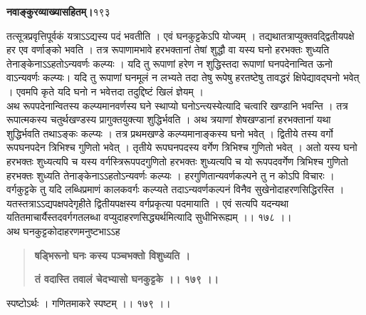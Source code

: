 \documentclass[11pt, openany]{book}
\begin{document}
\onehalfspacing
\hspace{2in}\textbf{नवाङ्कुरव्याख्यासहितम्।}\hspace{2in}१९३ 

\vspace{5mm}

\begin{sloppypar}
\hangindent=0.2in तत्सूत्रप्रवृत्तिपूर्वकं यत्राऽऽद्यस्य पदं भवतीति । एवं घनकुट्टकेऽपि योज्यम् । तद्यथा\textendash तत्राप्युक्तवद्द्वितीयपक्षे हर एव वर्णाङ्को भवति । तत्र रूपाणामभावे हरभक्तानां तेषां शुद्धौ वा यस्य घनो हरभक्तः शुध्यति तेनाङ्केनाऽऽहतोऽन्यवर्णः कल्प्यः । यदि तु रूपाणां हरेण न शुद्धिस्तदा रूपाणां घनपदेनान्वित ऊनो वाऽन्यवर्णः कल्प्यः। यदि तु रूपाणां घनमूलं न लभ्यते तदा तेषु रूपेषु हरतष्टेषु तावद्धरं क्षिपेद्यावद्घनो भवेत् । एवमपि कृते यदि घनो न भवेत्तदा तदुद्दिष्टं खिलं ज्ञेयम् ।\\ 

\hangindent=0.2in \hspace{0.2in}अथ रूपपदेनान्वितस्य कल्प्यमानवर्णस्य घने स्थाप्यो घनोऽन्त्यस्येत्यादि चत्वारि खण्डानि भवन्ति । तत्र रूपात्मकस्य चतुर्थखण्डस्य प्रागुक्तयुक्त्या शुद्धिर्भवति । अथ त्रयाणां शेषखण्डानां हरभक्तानां यथा शुद्धिर्भवति तथाऽङ्कः कल्प्यः । तत्र प्रथमखण्डे कल्प्यमानाङ्कस्य घनो भवेत् । द्वितीये तस्य वर्गो रूपघनपदेन त्रिभिश्च गुणितो भवेत् । तृतीये रूपघनपदस्य वर्गेण त्रिभिश्च गुणितो भवेत् । अतो यस्य घनो हरभक्तः शुध्यत्यपि च यस्य वर्गस्त्रिरूपपदगुणितो हरभक्तः शुध्यत्यपि च यो रूपपदवर्गेण त्रिभिश्च गुणितो हरभक्तः शुध्यति तेनाङ्केनाऽऽहतोऽन्यवर्णः कल्प्यः । हरगुणितान्यवर्णकल्पने तु न कोऽपि विचारः । वर्गकुट्टके तु यदि लब्धिप्रमाणं कालकवर्गः कल्प्यते तदाऽन्यवर्णकल्पनं विनैव सुखेनोदाहरणसिद्धिरस्ति । यतस्तत्राऽऽद्यपक्षपदेगृहीते द्वितीयपक्षस्य वर्गप्रकृत्या पदमायाति । एवं सत्यपि यदन्यथा यतितमाचार्यैस्तदवर्गगतलब्धा वप्युदाहरणसिद्ध्यर्थमित्यादि सुधीभिरूह्यम् ।। १७८ ।।\\

\hangindent=0.2in \hspace{0.2in}अथ घनकुट्टकोदाहरणमनुष्टभाऽऽह\textendash

\begin{quote}
\hspace{1in}\textbf{षड्भिरूनो घनः कस्य पञ्चभक्तो विशुध्यति ।}

\hspace{1in}\textbf{तं वदास्ति तवालं चेदभ्यासो घनकुट्टके ।। १७९ ।।}
\end{quote}

\hangindent=0.2in \hspace{0.2in}स्पष्टोऽर्थः । गणितमाकरे स्पष्टम् ।। १७९ ।। 


\end{sloppypar}
\end{document}
